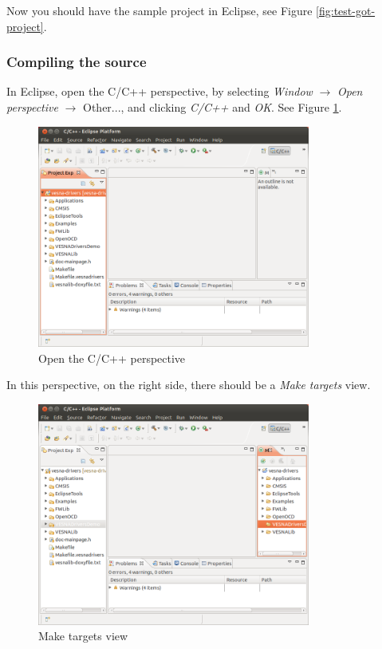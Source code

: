 \documentclass[a4paper, 10pt]{article}
\begin{document}
Now you should have the sample project in Eclipse, see
Figure \ref{fig:test-got-project}.

\subsubsection{Compiling the source}

In Eclipse, open the C/C++ perspective,  by selecting \emph{Window} $\rightarrow$
\emph{Open perspective} $\rightarrow$ Other...,
and clicking \emph{C/C++} and \emph{OK}.
See Figure \ref{fig:compile-c-perspective}.

    \begin{figure}[H]
    \centering
        \includegraphics[width=0.8\textwidth]{./install-guide-linux-images/compile-c-perspective.png}
        \caption{Open the C/C++ perspective}
        \label{fig:compile-c-perspective}
    \end{figure}

In this perspective,
on the right side, there should be a \emph{Make targets} view.

    \begin{figure}[H]
    \centering
        \includegraphics[width=0.8\textwidth]{./install-guide-linux-images/compile-make.png}
        \caption{Make targets view}
        \label{fig:compile-make}
    \end{figure}
\end{document}
